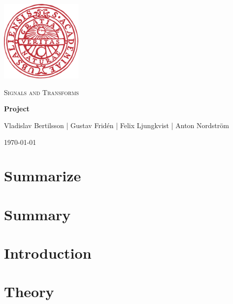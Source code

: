 \documentclass[12pt, a4paper]{article}
\begin{document}
\begin{titlepage}
\centering
	\onehalfspacing
	\includegraphics[width=0.3\textwidth]{Logga_UU.png}\par\vspace{1cm}
	\vspace{0cm}
    \begin{spacing}{0.5}


	{\scshape\Large Signals and Transforms \par}
	\ignorespaces
	{\fontsize{50}{60}\bfseries Project\par}
	
    \end{spacing}

\vspace{2cm}
\begin{center}
Vladislav Bertilsson | Gustav Fridén | Felix Ljungkvist | Anton Nordström\\ 
\vspace{1 cm}
\end{center}
\vspace{2 cm}
    {\large\today \par}
    {\normalsize }
	\vfill

\end{titlepage}

\newpage
\section{Summarize} 

\newpage\tableofcontents

\section{Summary}
\section{Introduction}
\section{Theory}
\end{document}
